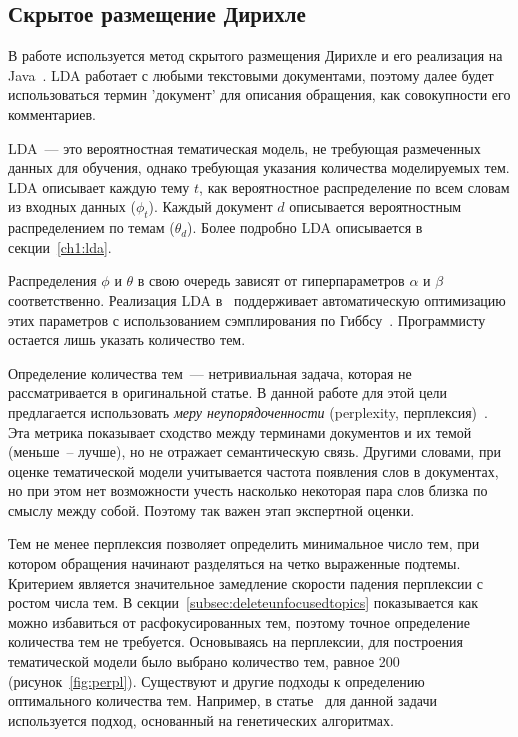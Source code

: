 \subsection{Скрытое размещение Дирихле}
\label{subsec:lda}

В работе используется метод скрытого размещения Дирихле и его реализация на Java~\cite{MALLET}. LDA работает с любыми текстовыми документами, поэтому далее будет использоваться термин 'документ' для описания обращения, как совокупности его комментариев.

LDA~--- это вероятностная тематическая модель, не требующая размеченных данных для обучения, однако требующая указания количества моделируемых тем. LDA описывает каждую тему $t$, как вероятностное распределение по всем словам из входных данных ($\phi_t$). Каждый документ $d$ описывается вероятностным распределением по темам ($\theta_d$). Более подробно LDA описывается в секции~\ref{ch1:lda}.

Распределения $\phi$ и $\theta$ в свою очередь зависят от гиперпараметров $\alpha$ и $\beta$ соответственно. Реализация LDA в~\cite{MALLET} поддерживает автоматическую оптимизацию этих параметров с использованием сэмплирования по Гиббсу~\cite{gibbs}. Программисту остается лишь указать количество тем.

Определение количества тем~--- нетривиальная задача, которая не рассматривается в оригинальной статье. В данной работе для этой цели предлагается использовать \textit{меру неупорядоченности} (perplexity, перплексия)~\cite{LDA}.  Эта метрика показывает сходство между терминами документов и их темой (меньше~-- лучше), но не отражает семантическую связь. Другими словами, при оценке тематической модели учитывается частота появления слов в документах, но при этом нет возможности учесть насколько некоторая пара слов близка по смыслу между собой. Поэтому так важен этап экспертной оценки.

Тем не менее перплексия позволяет определить минимальное число тем, при котором обращения начинают разделяться на четко выраженные подтемы. Критерием является значительное замедление скорости падения перплексии с ростом числа тем. В секции~\ref{subsec:deleteunfocusedtopics} показывается как можно избавиться от расфокусированных тем, поэтому точное определение количества тем не требуется. Основываясь на перплексии, для построения тематической модели было выбрано количество тем, равное 200 (рисунок~\ref{fig:perpl}). Существуют и другие подходы к определению оптимального количества тем. Например, в статье~\cite{TMuse} для данной задачи используется подход, основанный на генетических алгоритмах.

